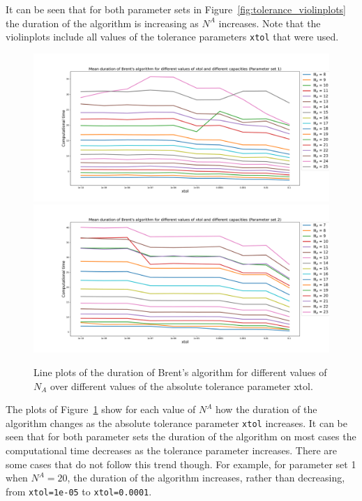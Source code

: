 It can be seen that for both parameter sets in
Figure~\ref{fig:tolerance_violinplots} the duration of the algorithm is
increasing as \(N^A\) increases.
Note that the violinplots include all values of the tolerance parameters
\lstinline[style=pystyle]{xtol} that were used.

\begin{figure}[H]
    \centering
    \includegraphics[width=\textwidth]{chapters/04_game_theoretic_model/img/brents_method/tolerance/tolerance_lineplots_1.pdf}
    \includegraphics[width=\textwidth]{chapters/04_game_theoretic_model/img/brents_method/tolerance/tolerance_lineplots_2.pdf}
    \caption{
        Line plots of the duration of Brent's algorithm for different values of
        \(N_A\) over different values of the absolute tolerance parameter xtol.
    }
    \label{fig:tolerance_lineplots}
\end{figure}

The plots of Figure~\ref{fig:tolerance_lineplots} show for each value of \(N^A\)
how the duration of the algorithm changes as the absolute tolerance parameter
\lstinline[style=pystyle]{xtol} increases.
It can be seen that for both parameter sets the duration of the algorithm
on most cases the computational time decreases as the tolerance parameter
increases.
There are some cases that do not follow this trend though.
For example, for parameter set 1 when \(N^A=20\), the duration of the algorithm
increases, rather than decreasing, from \lstinline[style=pystyle]{xtol=1e-05}
to \lstinline[style=pystyle]{xtol=0.0001}.



